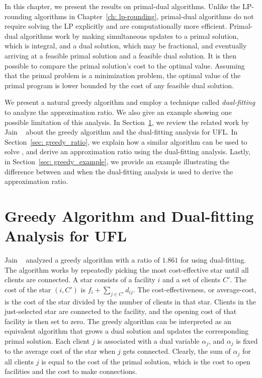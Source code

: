 \documentclass[oneside,final]{ucr}
\begin{document}
In this chapter, we present the results on primal-dual
algorithms. Unlike the LP-rounding algorithms in
Chapter~\ref{ch: lp-rounding}, primal-dual algorithms do not
require solving the LP explicitly and are computationally
more efficient. Primal-dual algorithms work by making
simultaneous updates to a primal solution, which is
integral, and a dual solution, which may be fractional, and
eventually arriving at a feasible primal solution and a
feasible dual solution. It is then possible to compare the
primal solution's cost to the optimal value. Assuming that
the primal problem is a minimization problem, the optimal
value of the primal program is lower bounded by the cost of
any feasible dual solution.

We present a natural greedy algorithm and employ a technique
called \emph{dual-fitting} to analyze the approximation
ratio. We also give an example showing one possible
limitation of this analysis.  In Section~\ref{sec: greedy},
we review the related work by Jain {\etal}~\cite{JainMMSV03}
about the greedy algorithm and the dual-fitting analysis for
UFL.  In Section~\ref{sec: greedy_ratio}, we explain how a
similar algorithm can be used to solve {\FTFP}, and derive
an approximation ratio using the dual-fitting
analysis. Lastly, in Section~\ref{sec: greedy_example}, we
provide an example illustrating the difference between
{\UFL} and {\FTFP} when the dual-fitting analysis is used to
derive the approximation ratio.

\section{Greedy Algorithm and Dual-fitting Analysis for UFL}
\label{sec: greedy}

Jain {\etal}~\cite{JainMMSV03} analyzed a greedy algorithm
with a ratio of $1.861$ for {\UFL} using dual-fitting. The
algorithm works by repeatedly picking the most
cost-effective star until all clients are connected. A star
consists of a facility $i$ and a set of clients $C'$. The
cost of the star $(i,C')$ is $f_i + \sum_{j\in C'} d_{ij}$.
The cost-effectiveness, or average-cost, is the cost of the
star divided by the number of clients in that star. Clients
in the just-selected star are connected to the facility, and
the opening cost of that facility is then set to zero. The
greedy algorithm can be interpreted as an equivalent
algorithm that grows a dual solution and updates the
corresponding primal solution. Each client $j$ is associated
with a dual variable $\alpha_j$, and $\alpha_j$ is fixed to
the average cost of the star when $j$ gets
connected. Clearly, the sum of $\alpha_j$ for all clients
$j$ is equal to the cost of the primal solution, which is
the cost to open facilities and the cost to make
connections.
\end{document}
